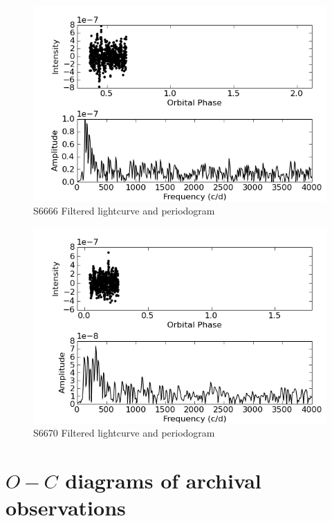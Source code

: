 \begin{figure}
 \centering
 \includegraphics[bb=0 0 600 400,width=0.85\columnwidth]{images/archive_phot/S6666/S6666d_FF.png}
 \caption{S6666 Filtered lightcurve and periodogram}
 \label{S6666_c_FF}
\end{figure}

\begin{figure}
 \centering
 \includegraphics[bb=0 0 600 400,width=0.85\columnwidth]{images/archive_phot/S6670/S6670d_FF.png}
 \caption{S6670 Filtered lightcurve and periodogram}
 \label{S6670_c_FF}
\end{figure}



\chapter{$O-C$ diagrams of archival observations}
\label{OminC_archive}

